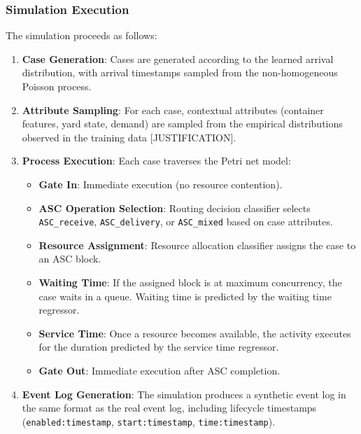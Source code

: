         \subsubsection{Simulation Execution}
        
        The simulation proceeds as follows:
        
        \begin{enumerate}
            \item \textbf{Case Generation}: Cases are generated according to the learned arrival distribution, with arrival timestamps sampled from the non-homogeneous Poisson process.
            \item \textbf{Attribute Sampling}: For each case, contextual attributes (container features, yard state, demand) are sampled from the empirical distributions observed in the training data [JUSTIFICATION].
            \item \textbf{Process Execution}: Each case traverses the Petri net model:
            \begin{itemize}
                \item \textbf{Gate In}: Immediate execution (no resource contention).
                \item \textbf{ASC Operation Selection}: Routing decision classifier selects \texttt{ASC\_receive}, \texttt{ASC\_delivery}, or \texttt{ASC\_mixed} based on case attributes.
                \item \textbf{Resource Assignment}: Resource allocation classifier assigns the case to an ASC block.
                \item \textbf{Waiting Time}: If the assigned block is at maximum concurrency, the case waits in a queue. Waiting time is predicted by the waiting time regressor.
                \item \textbf{Service Time}: Once a resource becomes available, the activity executes for the duration predicted by the service time regressor.
                \item \textbf{Gate Out}: Immediate execution after ASC completion.
            \end{itemize}
            \item \textbf{Event Log Generation}: The simulation produces a synthetic event log in the same format as the real event log, including lifecycle timestamps (\texttt{enabled:timestamp}, \texttt{start:timestamp}, \texttt{time:timestamp}).
        \end{enumerate}

